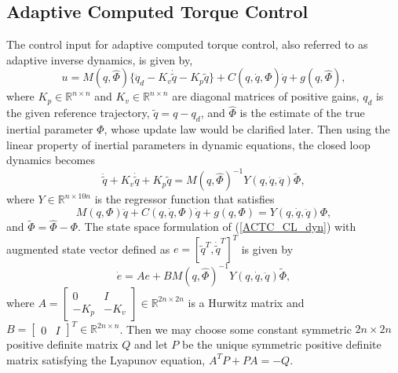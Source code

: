 \documentclass[letterpaper, 10 pt, conference]{ieeeconf}  %
\begin{document}
\subsection{Adaptive Computed Torque Control \cite{Craig_AdaptiveControl}}
The control input for adaptive computed torque control, also referred to as adaptive inverse dynamics, is given by,
\begin{equation}
u = M(q,\hat{\Phi})\{\ddot{q}_{d}-K_{v}\dot{\tilde{q}}-K_{p}\tilde{q}\}+C(q,\dot{q},\hat{\Phi})\dot{q}+g(q,\hat{\Phi}), \label{ACTC_input}
\end{equation}
where $K_p\in\mathbb{R}^{n\times n}$ and $K_{v}\in\mathbb{R}^{n\times n}$ are diagonal matrices of positive gains, $q_{d}$ is the given reference trajectory, $\tilde{q} = q - q_d$, and $\hat{\Phi}$ is the estimate of the true inertial parameter $\Phi$, whose update law would be clarified later. Then using the linear property of inertial parameters in dynamic equations, the closed loop dynamics becomes
\begin{equation}
\ddot{\tilde{q}}+K_{v}\dot{\tilde{q}}+K_{p}\tilde{q}=M(q,\hat{\Phi})^{-1}Y(q,\dot{q},\ddot{q})\tilde{\Phi}, \label{ACTC_CL_dyn}
\end{equation}
where $Y\in \mathbb{R}^{n\times10n}$ is the regressor function that satisfies
\begin{equation}
M(q,\Phi)\ddot{q}+C(q,\dot{q},\Phi)\dot{q} + g(q,\Phi) = Y(q,\dot{q},\ddot{q})\Phi,
\end{equation}
 and $\tilde{\Phi} =\hat{\Phi}-\Phi$. The state space formulation of (\ref{ACTC_CL_dyn}) with augmented state vector defined as $e=[\tilde{q}^{T}, \dot{\tilde{q}}^{T}]^{T}$ is given by 
\begin{equation}
\dot{e} = Ae+BM(q,\hat{\Phi})^{-1}Y(q,\dot{q},\ddot{q})\tilde{\Phi}, \label{ACTC_CL_error_dyn}
\end{equation}
where $A = \left[\begin{array}{cc} 0 & I \\ -K_{p} & -K_{v}\end{array}\right]\in \mathbb{R}^{2n\times2n}$ is a Hurwitz matrix and $B=\left[\begin{array}{cc} 0 & I\end{array}\right]^T\in\mathbb{R}^{2n\times n}$. Then we may choose some constant symmetric $2n\times 2n$ positive definite matrix $Q$ and let $P$ be the unique symmetric positive definite matrix satisfying the Lyapunov equation, $A^{T}P + PA = -Q$.
\end{document}
